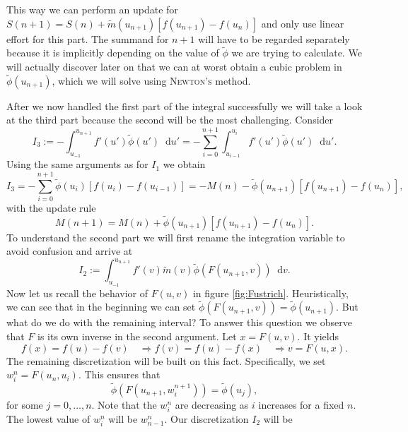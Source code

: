 \documentclass[12pt,a4paper,twoside, open=right]{scrreprt}
\theoremstyle{definition}
\theoremstyle{plain}
\newcommand{\D}{\mathop{}\!\mathrm{d}}
\begin{document}
This way we can perform an update for $S(n+1) = S(n)+\tilde{m}(u_{n+1})[f(u_{n+1})-f(u_n)]$ and  only use linear effort for this part. The summand for $n+1$ will have to be regarded separately because it is implicitly depending on the value of $\tilde\phi$ we are trying to calculate. We will actually discover later on that we can at worst obtain a cubic problem in $\tilde\phi(u_{n+1})$, which we will solve using \textsc{Newton's} method.
\par After we now handled the first part of the integral successfully we will take a look at the third part because the second will be the most challenging. Consider
\begin{equation}
    I_3:=-\int_{u_{-1}}^{u_{n+1}}f'(u')\tilde\phi(u')\D u' = -\sum_{i=0}^{n+1}\int_{u_{i-1}}^{u_i}f'(u')\tilde\phi(u')\D u'.
\end{equation} Using the same arguments as for $I_1$ we obtain
\begin{equation}
    I_3 = -\sum_{i=0}^{n+1}\tilde\phi(u_i)[f(u_i)-f(u_{i-1})] = -M(n) -\tilde\phi(u_{n+1})[f(u_{n+1})-f(u_{n})],
\end{equation}
with the update rule 
\begin{equation}
    M(n+1) = M(n) + \tilde\phi(u_{n+1})[f(u_{n+1})-f(u_{n})].
\end{equation}
To understand the second part we will first rename the integration variable to avoid confusion and arrive at
\begin{equation}
    I_2:=\int_{u_{-1}}^{u_{n+1}}f'(v)\tilde{m}(v)\tilde{\phi}(F(u_{n+1},v))\D v.
\end{equation}
Now let us recall the behavior of $F(u,v)$ in figure \ref{fig:Fustrich}. Heuristically, we can see that in the beginning we can set $\tilde\phi(F(u_{n+1},v))=\tilde\phi(u_{n+1})$. But what do we do with the remaining interval? To answer this question we observe that $F$ is its own inverse in the second argument. Let $x = F(u,v)$. It yields
\begin{equation}
    f(x)=f(u)-f(v)\quad\Rightarrow f(v)=f(u)-f(x)\quad\Rightarrow v= F(u,x).
\end{equation}
The remaining discretization will be built on this fact. Specifically, we set $w_i^n=F(u_n,u_i)$. This ensures that 
\begin{equation}
    \tilde\phi(F(u_{n+1},w^{n+1}_i))=\tilde{\phi}(u_j),
\end{equation}
for some $j=0,\dotsc,n$. Note that the $w_i^n$ are decreasing as $i$ increases for a fixed $n$. The lowest value of $w_i^n$ will be $w_{n-1}^n$. Our discretization $I_2$ will be 
\end{document}
